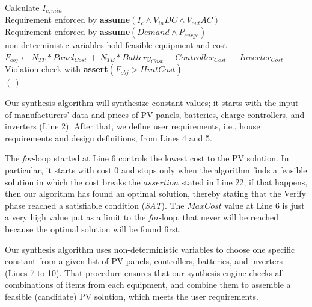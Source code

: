 \documentclass[runningheads]{llncs}
\begin{document}
\begin{algorithm}
\begin{algorithmic}[1]
\begin{scriptsize}
 	\STATE Calculate $I_{c,min}$ \\
 	\STATE Requirement enforced by \textbf{assume}$(I_{c} \wedge V_{in}DC \wedge V_{out}AC)$ \\
	\STATE Requirement enforced by \textbf{assume}$(Demand \wedge P_{surge})$ \\
	\STATE non-deterministic variables hold feasible equipment and cost  \\
	\STATE $F_{obj} \leftarrow  N_{TP}*Panel_{Cost} \, + \, N_{TB}*Battery_{Cost} \, + Controller_{Cost} \, + \, Inverter_{Cost}$ \\
	\STATE Violation check with \textbf{assert}$(F_{obj} > HintCost)$ \\
  \ENDFOR
 \RETURN $(\,)$ 
  \end{scriptsize}
 \end{algorithmic} 
 \label{alg:verification-algorithm}
 \end{algorithm}

Our synthesis algorithm will synthesize constant values; it starts with the input of manufacturers' data and prices of PV panels, batteries, charge controllers, and inverters (Line 2). After that, we define user requirements, i.e., house requirements and design definitions, from Lines 4 and 5. 

The \textit{for}-loop started at Line 6 controls the lowest cost to the PV solution. In particular, it starts with cost $0$ and stops only when the algorithm finds a feasible solution in which the cost breaks the $assertion$ stated in Line 22; if that happens, then our algorithm has found an optimal solution, thereby stating that the {\sc Verify} phase reached a satisfiable condition (\textit{SAT}). The $MaxCost$ value at Line 6 is just a very high value put as a limit to the \textit{for}-loop, that never will be reached because the optimal solution will be found first.

Our synthesis algorithm uses non-deterministic variables to choose one specific constant from a given list of PV panels, controllers, batteries, and inverters (Lines 7 to 10). That procedure ensures that our synthesis engine checks all combinations of items from each equipment, and combine them to assemble a feasible (candidate) PV solution, which meets the user requirements.
\end{document}
